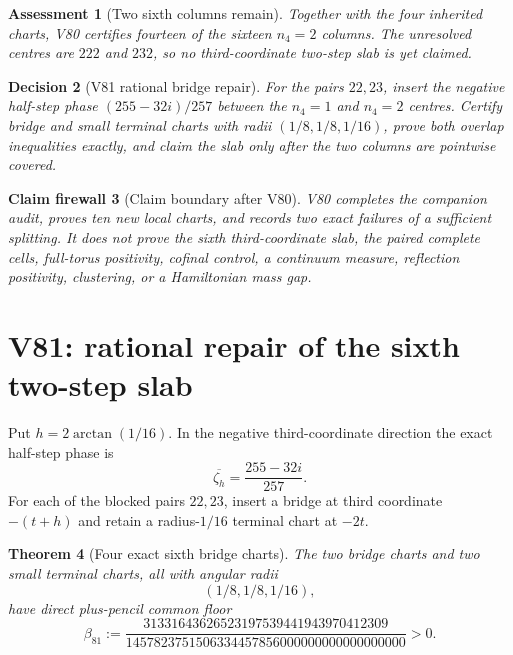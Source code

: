 \documentclass[11pt,oneside]{article}
\newtheorem{theorem}{Theorem}[section]
\newtheorem{assessment}[theorem]{Assessment}
\newtheorem{firewall}[theorem]{Claim firewall}
\newtheorem{decision}[theorem]{Decision}
\theoremstyle{definition}
\theoremstyle{remark}
\begin{document}
\begin{assessment}[Two sixth columns remain]
\label{ass:newv80}
Together with the four inherited charts, V80 certifies fourteen of
the sixteen \(n_4=2\) columns.  The unresolved centres are \(222\)
and \(232\), so no third-coordinate two-step slab is yet claimed.
\end{assessment}

\begin{decision}[V81 rational bridge repair]
\label{dec:newv80-next}
For the pairs \(22,23\), insert the negative half-step phase
\((255-32i)/257\) between the \(n_4=1\) and \(n_4=2\) centres.
Certify bridge and small terminal charts with radii
\((1/8,1/8,1/16)\), prove both overlap inequalities exactly, and
claim the slab only after the two columns are pointwise covered.
\end{decision}

\begin{firewall}[Claim boundary after V80]
\label{fire:newv80-final}
V80 completes the companion audit, proves ten new local charts, and
records two exact failures of a sufficient splitting.  It does not
prove the sixth third-coordinate slab, the paired complete cells,
full-torus positivity, cofinal control, a continuum measure,
reflection positivity, clustering, or a Hamiltonian mass gap.
\end{firewall}

\section{V81: rational repair of the sixth two-step slab}
\label{sec:newv81-sixth-bridge}

Put \(h=2\arctan(1/16)\).  In the negative third-coordinate
direction the exact half-step phase is
\[
 \overline{\zeta_h}=\frac{255-32i}{257}.               \tag{81.1}
\]
For each of the blocked pairs \(22,23\), insert a bridge at third
coordinate \(-(t+h)\) and retain a radius-\(1/16\) terminal chart at
\(-2t\).

\begin{theorem}[Four exact sixth bridge charts]
\label{thm:newv81-bridges}
The two bridge charts and two small terminal charts, all with angular
radii
\[
 (1/8,1/8,1/16),                                       \tag{81.2}
\]
have direct plus-pencil common floor
\[
 \beta_{81}:=
 \frac{31331643626523197539441943970412309}
 {1457823751506334457856000000000000000000}>0.         \tag{81.3}
\]
\end{theorem}
\end{document}

